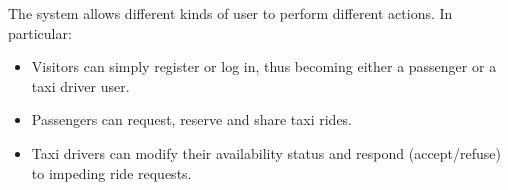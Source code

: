 The system allows different kinds of user to perform different actions. In particular:
\begin{itemize}
  \item Visitors can simply register or log in, thus becoming either a passenger or a taxi driver user.
  \item Passengers can request, reserve and share taxi rides.
  \item Taxi drivers can modify their availability status and respond (accept/refuse) to impeding ride requests.
\end{itemize}
